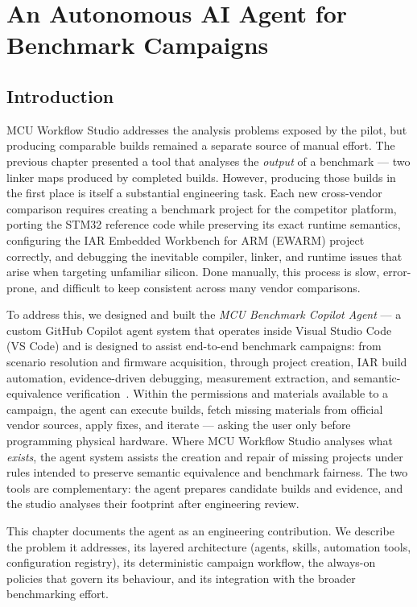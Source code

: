 \chapter{An Autonomous AI Agent for Benchmark Campaigns}
\label{chap:benchmark-agent}

\section*{Introduction}

MCU Workflow Studio addresses the analysis problems exposed by the pilot, but producing
comparable builds remained a separate source of manual effort. The previous chapter
presented a tool that analyses the \emph{output} of a benchmark ---
two linker maps produced by completed builds. However, producing those builds in the first
place is itself a substantial engineering task. Each new cross-vendor comparison requires
creating a benchmark project for the competitor platform, porting the STM32 reference code
while preserving its exact runtime semantics, configuring the IAR Embedded Workbench for
ARM (EWARM) project correctly, and debugging the inevitable compiler, linker, and runtime
issues that arise when targeting unfamiliar silicon. Done manually, this process is slow,
error-prone, and difficult to keep consistent across many vendor comparisons.

To address this, we designed and built the \emph{MCU Benchmark Copilot Agent} --- a custom
GitHub Copilot agent system that operates inside Visual Studio Code (VS Code) and
is designed to assist end-to-end benchmark campaigns: from scenario resolution and
firmware acquisition, through project creation, IAR build automation, evidence-driven
debugging, measurement extraction, and semantic-equivalence verification~\cite{vscode,
github-copilot}. Within the permissions and materials available to a campaign, the agent
can execute builds, fetch missing
materials from official vendor sources, apply fixes, and iterate --- asking the user
only before programming physical hardware. Where MCU Workflow Studio analyses what
\emph{exists}, the agent system assists the creation and repair of missing projects under
rules intended to preserve semantic equivalence and benchmark fairness. The two tools are
complementary: the agent prepares candidate builds and evidence, and the studio analyses
their footprint after engineering review.

This chapter documents the agent as an engineering contribution. We describe the problem it
addresses, its layered architecture (agents, skills, automation tools, configuration
registry), its deterministic campaign workflow, the always-on policies that govern its
behaviour, and its integration with the broader benchmarking effort.

